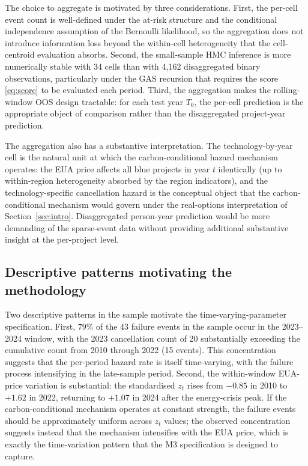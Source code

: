 \documentclass[12pt,a4paper]{article}
\theoremstyle{plain}
\theoremstyle{definition}
\begin{document}
The choice to aggregate is motivated by three considerations. First, the per-cell event count is well-defined under the at-risk structure and the conditional independence assumption of the Bernoulli likelihood, so the aggregation does not introduce information loss beyond the within-cell heterogeneity that the cell-centroid evaluation absorbs. Second, the small-sample HMC inference is more numerically stable with 34 cells than with 4{,}162 disaggregated binary observations, particularly under the GAS recursion that requires the score \eqref{eq:score} to be evaluated each period. Third, the aggregation makes the rolling-window OOS design tractable: for each test year $T_0$, the per-cell prediction is the appropriate object of comparison rather than the disaggregated project-year prediction.

The aggregation also has a substantive interpretation. The technology-by-year cell is the natural unit at which the carbon-conditional hazard mechanism operates: the EUA price affects all blue projects in year $t$ identically (up to within-region heterogeneity absorbed by the region indicators), and the technology-specific cancellation hazard is the conceptual object that the carbon-conditional mechanism would govern under the real-options interpretation of Section~\ref{sec:intro}. Disaggregated person-year prediction would be more demanding of the sparse-event data without providing additional substantive insight at the per-project level.

\subsection{Descriptive patterns motivating the methodology}

Two descriptive patterns in the sample motivate the time-varying-parameter specification. First, 79\% of the 43 failure events in the sample occur in the 2023--2024 window, with the 2023 cancellation count of 20 substantially exceeding the cumulative count from 2010 through 2022 (15 events). This concentration suggests that the per-period hazard rate is itself time-varying, with the failure process intensifying in the late-sample period. Second, the within-window EUA-price variation is substantial: the standardised $z_t$ rises from $-0.85$ in 2010 to $+1.62$ in 2022, returning to $+1.07$ in 2024 after the energy-crisis peak. If the carbon-conditional mechanism operates at constant strength, the failure events should be approximately uniform across $z_t$ values; the observed concentration suggests instead that the mechanism intensifies with the EUA price, which is exactly the time-variation pattern that the M3 specification is designed to capture.
\end{document}
